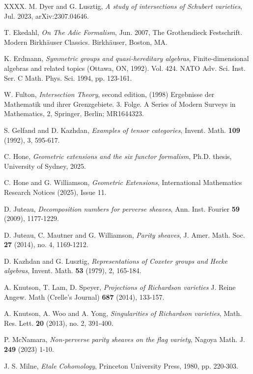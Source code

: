 \documentclass[11pt]{article}
\theoremstyle{remark}
\theoremstyle{definition}
\begin{document}
{\begin{thebibliography}{XXXX.}
M. Dyer and G. Lusztig,
\emph{A study of intersections of Schubert varieties},
Jul. 2023, arXiv:2307.04646. 

T. Ekedahl,
\emph{On The Adic Formalism},
Jun. 2007, The Grothendieck Festschrift. Modern Birkhäuser Classics. Birkhäuser, Boston, MA.

K. Erdmann,
\emph{Symmetric groups and quasi-hereditary algebras},
Finite-dimensional algebras and related topics (Ottawa, ON,
1992). Vol. 424. NATO Adv. Sci. Inst. Ser. C Math. Phys. Sci.
 1994, pp. 123-161.
 
W. Fulton,
\emph{Intersection Theory}, second edition, (1998)
Ergebnisse der Mathematik und ihrer Grenzgebiete. 3. Folge. A Series of Modern Surveys in Mathematics, 2, Springer, Berlin; MR1644323.

S. Gelfand and D. Kazhdan, 
\emph{Examples of tensor categories},
Invent. Math. \textbf{109} (1992), 3, 595-617.

C. Hone, 
\emph{Geometric extensions and the six functor formalism},
Ph.D. thesis, University of Sydney, 2025.

C. Hone and G. Williamson, 
\emph{Geometric Extensions}, 
International Mathematics Research Notices (2025), Issue 11.

D. Juteau, 
\emph{Decomposition numbers for perverse sheaves}, 
Ann. Inst. Fourier \textbf{59} (2009), 1177-1229.

D. Juteau, C. Mautner and G. Williamson,
\emph{Parity sheaves},
J. Amer. Math. Soc. \textbf{27} (2014), no. 4, 1169-1212.

D. Kazhdan and G. Lusztig,
\emph{Representations of Coxeter groups and Hecke algebras},
Invent. Math. \textbf{53} (1979), 2, 165-184.

A. Knutson, T. Lam, D. Speyer, 
\emph{Projections of Richardson varieties}
J. Reine Angew. Math (Crelle’s Journal) \textbf{687} (2014), 133-157.

A. Knutson, A. Woo and A. Yong,
\emph{Singularities of Richardson varieties},
Math. Res. Lett. \textbf{20} (2013), no. 2, 391-400.

P. McNamara, 
\emph{Non-perverse parity sheaves on the flag variety}, 
Nagoya Math. J. \textbf{249} (2023) 1-10.

J. S. Milne,
\emph{Etale Cohomology},
Princeton University Press, 1980, pp. 220-303.


\end{thebibliography}}
\end{document}

